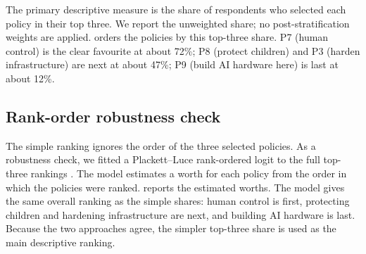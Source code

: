 The primary descriptive measure is the share of respondents who selected each policy in their top three. We report the unweighted share; no post-stratification weights are applied.  orders the policies by this top-three share. P7 (human control) is the clear favourite at about 72\%; P8 (protect children) and P3 (harden infrastructure) are next at about 47\%; P9 (build AI hardware here) is last at about 12\%.


\subsection{Rank-order robustness check}

The simple ranking ignores the order of the three selected policies. As a robustness check, we fitted a Plackett--Luce rank-ordered logit to the full top-three rankings \cite{plackettAnalysisPermutations1975,luceIndividualChoiceBehavior1959}. The model estimates a worth for each policy from the order in which the policies were ranked.  reports the estimated worths. The model gives the same overall ranking as the simple shares: human control is first, protecting children and hardening infrastructure are next, and building AI hardware is last. Because the two approaches agree, the simpler top-three share is used as the main descriptive ranking.

